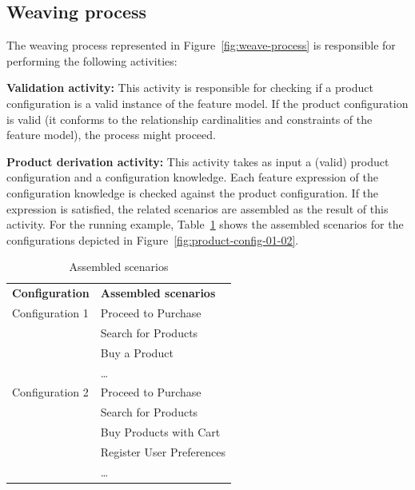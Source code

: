 \documentclass{report}
\begin{document}
\begin{frontmatter}
\subsection{Weaving process}\label{sub:wp}

The weaving process represented in Figure~\ref{fig:weave-process} is responsible for performing the following activities: 

{\bf Validation activity:} This activity is responsible for checking if a product configuration is a valid instance of the feature model. If the product configuration is 
valid (it conforms to the relationship cardinalities and constraints of the feature model), the process might proceed. 

{\bf Product derivation activity:} This activity takes as input a (valid) product configuration and a configuration knowledge. 
Each feature expression of the configuration knowledge is checked against the product configuration. If the expression 
is satisfied, the related scenarios are assembled as the result of this activity. For the running example, 
Table~\ref{tab:assembled-scenarios} shows the assembled scenarios for the configurations depicted in Figure~\ref{fig:product-config-01-02}.

\begin{table}[h]
\begin{center}
\nocaptionrule \caption{Assembled scenarios} \label{tab:assembled-scenarios}
\begin{tabular}{ll}
   \hline\noalign{\smallskip}
  {\bf Configuration} & {\bf Assembled scenarios} \\
   \noalign{\smallskip}
   \hline
   \noalign{\smallskip}
    Configuration 1\hspace{15pt} & Proceed to Purchase \\
                                                   & Search for Products \\
                                                   & Buy a Product \\
                             			  & \ldots \\
   Configuration 2                        & Proceed to Purchase \\
                             			  & Search for Products	 \\
			                           & Buy Products with Cart \\
                                                   & Register User Preferences \\
                             & \ldots       \\
  \hline
\end{tabular}
\end{center}
\end{table}
 

\end{frontmatter}
\end{document}
